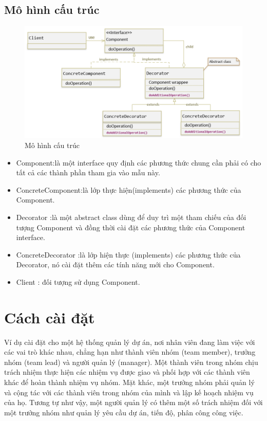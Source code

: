 \subsection{Mô hình cấu trúc}
\begin{figure}[!htb]
    \centering
    \includegraphics[width=\textwidth]{fig/Decorator/structure_decorator.png}
    \caption{Mô hình cấu trúc}
    \label{fig:structure_decorator}
\end{figure}
\newpage
\begin{itemize}
    \item Component:là một interface quy định các phương thức chung cần phải có cho tất cả các thành phần tham gia vào mẫu này.
    \item ConcreteComponent:là lớp thực hiện(implements) các phương thức của Component.
    \item Decorator :là một abstract class dùng để duy trì một tham chiếu của đối tượng Component và đồng thời cài đặt các phương thức của Component  interface.
    \item ConcreteDecorator :là lớp hiện thực (implements) các phương thức của Decorator, nó cài đặt thêm các tính năng mới cho Component.
    \item Client : đối tượng sử dụng Component.
\end{itemize}

\section{Cách cài đặt}
Ví dụ cài đặt cho một hệ thống quản lý dự án, nơi nhân viên đang làm việc với các vai trò khác nhau, chẳng hạn như thành viên nhóm (team member), trưởng nhóm (team lead) và người quản lý (manager). Một thành viên trong nhóm chịu trách nhiệm thực hiện các nhiệm vụ được giao và phối hợp với các thành viên khác để hoàn thành nhiệm vụ nhóm. Mặt khác, một trưởng nhóm phải quản lý và cộng tác với các thành viên trong nhóm của mình và lập kế hoạch nhiệm vụ của họ. Tương tự như vậy, một người quản lý có thêm một số trách nhiệm đối với một trưởng nhóm như quản lý yêu cầu dự án, tiến độ, phân công công việc.

